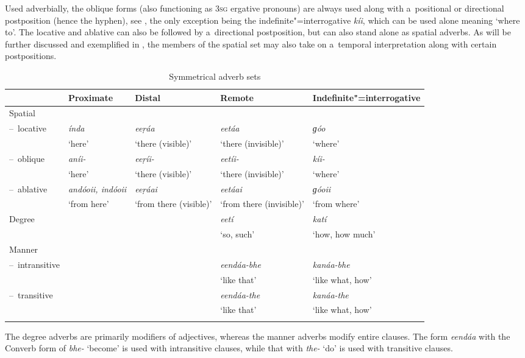 Used adverbially, the oblique forms (also functioning as \textsc{3sg} ergative pronouns) are always used
along with a~positional or directional postposition (hence the hyphen), see , the only
exception being the indefinite"=interrogative \textit{kíi}, which can be used alone meaning
`where to'. The locative and ablative can also be followed by a~directional postposition, but can
also stand alone as spatial adverbs. As will be further discussed and exemplified in , the
members of the spatial set may also take on a~temporal interpretation along with certain
postpositions.


\begin{table}[ht]
\caption{Symmetrical adverb sets}
\begin{tabularx}{\textwidth}{ l Q Q Q Q }
\lsptoprule
&
Proximate &
Distal &
Remote &
Indefinite"=interrogative\\\hline
Spatial &
&
&
&
\\
--~locative &
\textit{índa} &
\textit{eeṛáa} &
\textit{eetáa} &
\textit{ɡóo} \\
&
`here' &
`there (visible)' &
`there (invisible)' &
`where'\\
--~oblique &
\textit{aníi-} &
\textit{eeṛíi-} &
\textit{eetíi-} &
\textit{kíi-} \\
&
`here' &
`there (visible)' &
`there (invisible)' &
`where'\\
--~ablative &
\textit{andóoii, indóoii} &
\textit{eeṛáai} &
\textit{eetáai} &
\textit{ɡóoii} \\
&
`from here' &
`from there (visible)' &
`from there (invisible)' &
`from where'\\
Degree &
&
&
\textit{eetí} &
\textit{katí} \\
&
&
&
`so, such' &
`how, how much'\\
Manner &
&
&
&
\\
--~intransitive &
&
&
\textit{eendáa-bhe} &
\textit{kanáa-bhe} \\
&
&
&
`like that' &
`like what, how'\\
--~transitive &
&
&
\textit{eendáa-the} &
\textit{kanáa-the} \\
&
&
&
`like that' &
`like what, how'\\\lspbottomrule
\end{tabularx}
\label{tab:7-1}
\end{table}

The degree adverbs are primarily modifiers of adjectives, whereas the manner adverbs modify entire clauses. The form \textit{eendáa} with the Converb form of \textit{bhe-} `become' is used with intransitive clauses, while that with \textit{the-} `do' is used with transitive clauses. 

